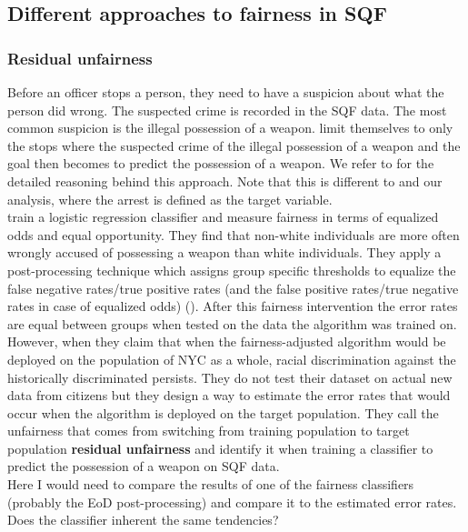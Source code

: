 \subsection{Different approaches to fairness in SQF}
\subsubsection*{Residual unfairness}
Before an officer stops a person, they need to have a suspicion about what the person did wrong. The suspected crime is recorded in the SQF data. The most common suspicion is the illegal possession of a weapon. \cite{kallus2018} limit themselves to only the stops where the suspected crime of the illegal possession of a weapon and the goal then becomes to predict the possession of a weapon. We refer to \cite{goel2016} for the detailed reasoning behind this approach.
Note that this is different to \cite{Badr2022DTFANSP} and our analysis, where the arrest is defined as the target variable.\\

\cite{kallus2018} train a logistic regression classifier and measure fairness in terms of equalized odds and equal opportunity. They find that non-white individuals are more often wrongly accused of possessing a weapon than white individuals. They apply a post-processing technique which assigns group specific thresholds to equalize the false negative rates/true positive rates (and the false positive rates/true negative rates in case of equalized odds) (\cite{hardt2016}).
After this fairness intervention the error rates are equal between groups when tested on the data the algorithm was trained on. However, when they claim that when the fairness-adjusted algorithm would be deployed on the population of NYC as a whole, racial discrimination against the historically discriminated persists. They do not test their dataset on actual new data from citizens but they design a way to estimate the error rates that would occur when the algorithm is deployed on the target population. They call the unfairness that comes from switching from training population to target population \textbf{residual unfairness} and identify it when training a classifier to predict the possession of a weapon on SQF data.\\
Here I would need to compare the results of one of the fairness classifiers (probably the EoD post-processing) and compare it to the estimated error rates. Does the classifier inherent the same tendencies?

